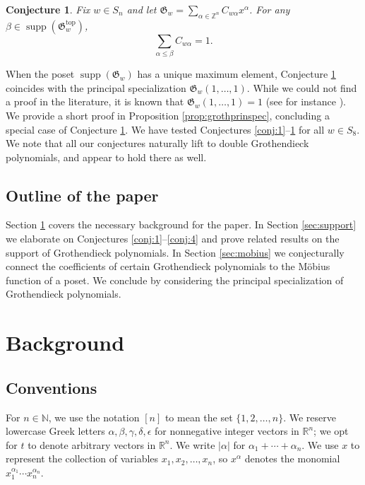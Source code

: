 \documentclass{amsart}
\newtheorem{conjecture}[theorem]{Conjecture}
\theoremstyle{definition}
\theoremstyle{named}
\DeclareMathOperator{\supp}{supp}
\begin{document}
	\begin{conjecture} 
		\label{conj:coeff}
		Fix $w\in S_n$ and let $\mathfrak{G}_w = \sum_{\alpha\in\mathbb{Z}^n}C_{w\alpha}x^\alpha$. For any $\beta\in\supp(\mathfrak{G}_w^{\mathrm{top}})$,
		\[\sum_{\alpha\leq \beta} C_{w\alpha} = 1. \]
	\end{conjecture}
	When the poset $\supp(\mathfrak{G}_w)$ has a unique maximum element, 
	Conjecture \ref{conj:coeff} coincides with the principal specialization $\mathfrak{G}_w(1,\ldots,1)$. While we could not find a proof in the literature, it is known that $\mathfrak{G}_w(1,\ldots,1)=1$ (see for instance \cite[Comment 3.2]{dunkl}). We provide a short proof in Proposition \ref{prop:grothprinspec}, concluding a special case of Conjecture \ref{conj:coeff}. We have tested Conjectures \ref{conj:1}--\ref{conj:coeff} for all $w\in S_8$. We note that all our conjectures naturally lift to double Grothendieck polynomials, and appear to hold there as well.
	
	 \subsection{Outline of the paper} Section \ref{sec:back} covers the necessary background for the paper. In Section \ref{sec:support} we elaborate on Conjectures \ref{conj:1}--\ref{conj:4} and prove related results on the support of Grothendieck polynomials. In Section \ref{sec:mobius} we conjecturally connect the coefficients of certain Grothendieck polynomials to the M\"obius function of a poset. We conclude by considering the principal specialization of Grothendieck polynomials.
	
	\section{Background}
	\label{sec:back}
	\subsection{Conventions}
	For $n\in \mathbb{N}$, we use the notation $[n]$ to mean the set $\{1,2,\ldots,n \}$. We reserve lowercase Greek letters $\alpha,\beta,\gamma,\delta,\epsilon$ for nonnegative integer vectors in $\mathbb{R}^n$; we opt for $t$ to denote arbitrary vectors in $\mathbb{R}^n$. We write $|\alpha|$ for $\alpha_1+\cdots+\alpha_n$. We use $x$ to represent the collection of variables $x_1,x_2,\ldots,x_n$, so $x^\alpha$ denotes the monomial $x_1^{\alpha_1}\cdots x_n^{\alpha_n}$.
	
\end{document}
